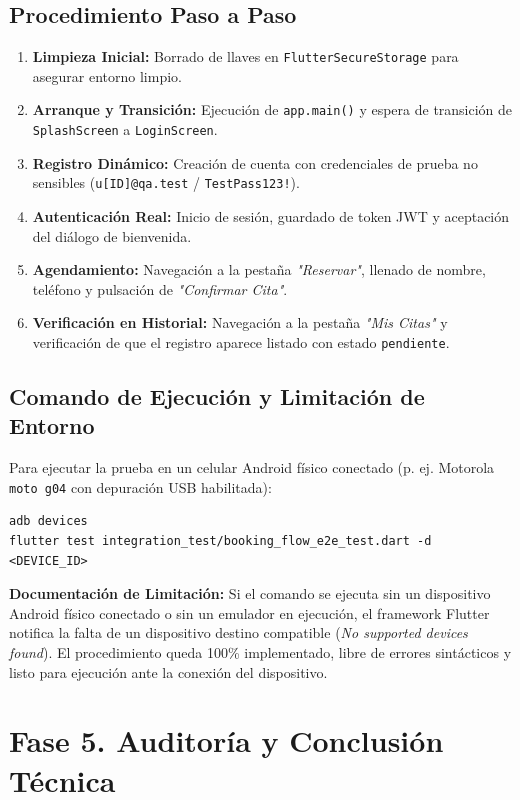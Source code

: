 \documentclass[11pt,a4paper]{article}
\begin{document}
\subsection{Procedimiento Paso a Paso}
\begin{enumerate}
    \item \textbf{Limpieza Inicial:} Borrado de llaves en \texttt{FlutterSecureStorage} para asegurar entorno limpio.
    \item \textbf{Arranque y Transición:} Ejecución de \texttt{app.main()} y espera de transición de \texttt{SplashScreen} a \texttt{LoginScreen}.
    \item \textbf{Registro Dinámico:} Creación de cuenta con credenciales de prueba no sensibles (\texttt{u[ID]@qa.test} / \texttt{TestPass123!}).
    \item \textbf{Autenticación Real:} Inicio de sesión, guardado de token JWT y aceptación del diálogo de bienvenida.
    \item \textbf{Agendamiento:} Navegación a la pestaña \textit{"Reservar"}, llenado de nombre, teléfono y pulsación de \textit{"Confirmar Cita"}.
    \item \textbf{Verificación en Historial:} Navegación a la pestaña \textit{"Mis Citas"} y verificación de que el registro aparece listado con estado \texttt{pendiente}.
\end{enumerate}

\subsection{Comando de Ejecución y Limitación de Entorno}
Para ejecutar la prueba en un celular Android físico conectado (p. ej. Motorola \texttt{moto g04} con depuración USB habilitada):

\begin{verbatim}
adb devices
flutter test integration_test/booking_flow_e2e_test.dart -d <DEVICE_ID>
\end{verbatim}

\textbf{Documentación de Limitación:} Si el comando se ejecuta sin un dispositivo Android físico conectado o sin un emulador en ejecución, el framework Flutter notifica la falta de un dispositivo destino compatible (\textit{No supported devices found}). El procedimiento queda 100\% implementado, libre de errores sintácticos y listo para ejecución ante la conexión del dispositivo.

\section{Fase 5. Auditoría y Conclusión Técnica}
\end{document}
